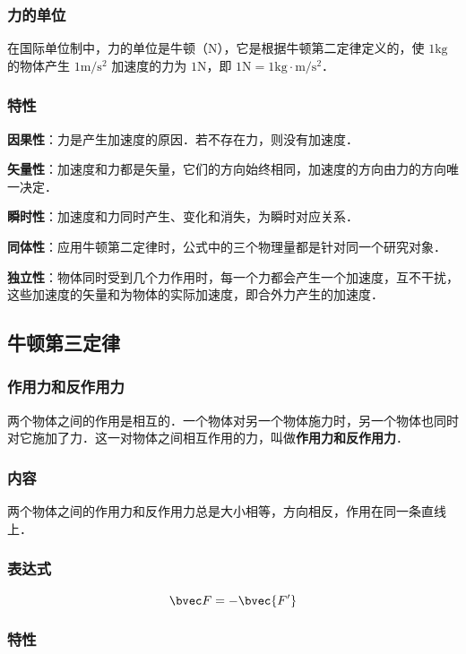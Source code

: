 \subsubsection{力的单位}
在国际单位制中，力的单位是牛顿（$\mathrm N$），它是根据牛顿第二定律定义的，使 $1\mathrm{kg}$ 的物体产生 $1\mathrm{m/s^2}$ 加速度的力为 $1\mathrm N$，即 $1\mathrm N=1\mathrm{kg \cdot m/s^2}$．

\subsubsection{特性}
\textbf{因果性}：力是产生加速度的原因．若不存在力，则没有加速度．

\textbf{矢量性}：加速度和力都是矢量，它们的方向始终相同，加速度的方向由力的方向唯一决定．

\textbf{瞬时性}：加速度和力同时产生、变化和消失，为瞬时对应关系．

\textbf{同体性}：应用牛顿第二定律时，公式中的三个物理量都是针对同一个研究对象．

\textbf{独立性}：物体同时受到几个力作用时，每一个力都会产生一个加速度，互不干扰，这些加速度的矢量和为物体的实际加速度，即合外力产生的加速度．

\subsection{牛顿第三定律}
\subsubsection{作用力和反作用力}
两个物体之间的作用是相互的．一个物体对另一个物体施力时，另一个物体也同时对它施加了力．这一对物体之间相互作用的力，叫做\textbf{作用力和反作用力}．

\subsubsection{内容}
两个物体之间的作用力和反作用力总是大小相等，方向相反，作用在同一条直线上．

\subsubsection{表达式}
\begin{equation}
\bvec F=-\bvec {F'}
\end{equation}

\subsubsection{特性}

